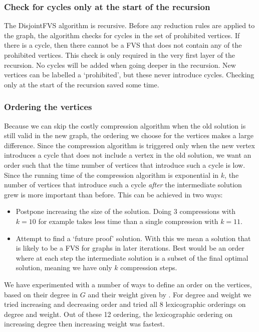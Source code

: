 \subsubsection{Check for cycles only at the start of the recursion}
The {\sc DisjointFVS} algorithm is recursive. Before
any reduction rules are applied to the graph, the algorithm checks for cycles in the set of prohibited vertices. If
there is a cycle, then there cannot be a FVS that does not contain any of the prohibited vertices. This check is only
required in the very first layer of the recursion. No cycles will be added when going deeper in the recursion. New
vertices can be labelled a `prohibited', but these never introduce cycles. Checking only at the start of the recursion
saved some time.

\subsubsection{Ordering the vertices}
Because we can skip the costly compression algorithm when the old solution is
still valid in the new graph, the ordering we choose for the vertices makes a large difference. Since the compression
algorithm is triggered only when the new vertex introduces a cycle that does not include a vertex in the old solution,
we want an order such that the time number of vertices that introduce such a cycle is low. Since the running time of the
compression algorithm is exponential in $k$, the number of vertices that introduce such a cycle \emph{after} the
intermediate solution grew is more important than before. This can be achieved in two ways: \begin{itemize} \item
Postpone increasing the size of the solution. Doing $3$ compressions with $k=10$ for example takes less time than a
single compression with $k=11$.  \item Attempt to find a `future proof' solution. With this we mean a solution that is
likely to be a FVS for graphs in later iterations. Best would be an order where at each step the intermediate solution
is a subset of the final optimal solution, meaning we have only $k$ compression steps.  \end{itemize} We have
experimented with a number of ways to define an order on the vertices, based on their degree in $G$ and their weight
given by . For degree and weight we tried increasing and decreasing order and tried
all 8 lexicographic orderings on degree and weight. Out of these 12 ordering, the lexicographic ordering on increasing
degree then increasing weight was fastest.

